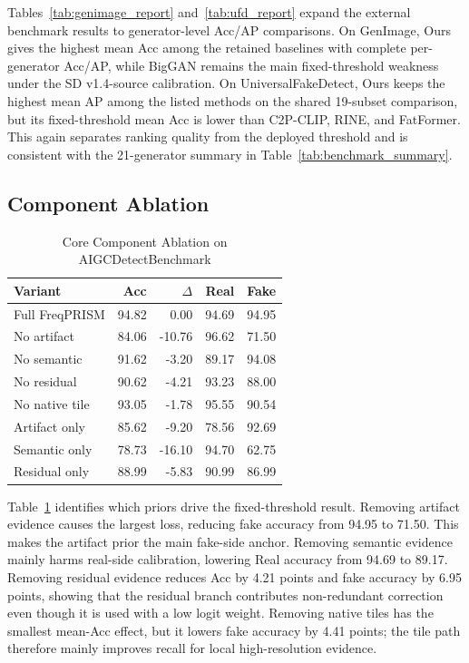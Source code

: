 \documentclass[lettersize,journal]{IEEEtran}
\begin{document}
Tables~\ref{tab:genimage_report} and~\ref{tab:ufd_report} expand the external benchmark results to generator-level Acc/AP comparisons. On GenImage, Ours gives the highest mean Acc among the retained baselines with complete per-generator Acc/AP, while BigGAN remains the main fixed-threshold weakness under the SD v1.4-source calibration. On UniversalFakeDetect, Ours keeps the highest mean AP among the listed methods on the shared 19-subset comparison, but its fixed-threshold mean Acc is lower than C2P-CLIP, RINE, and FatFormer. This again separates ranking quality from the deployed threshold and is consistent with the 21-generator summary in Table~\ref{tab:benchmark_summary}.

\clearpage

\subsection{Component Ablation}
\label{sec:ablation_study}

\begin{table}[t]
\caption{Core Component Ablation on AIGCDetectBenchmark}
\label{tab:prior_ablation}
\centering
\scriptsize
\renewcommand{\arraystretch}{1.08}
\setlength{\tabcolsep}{4pt}
\begin{tabular}{lrrrr}
\toprule
Variant & Acc & $\Delta$ & Real & Fake \\
\midrule
Full FreqPRISM & 94.82 & 0.00 & 94.69 & 94.95 \\
No artifact & 84.06 & -10.76 & 96.62 & 71.50 \\
No semantic & 91.62 & -3.20 & 89.17 & 94.08 \\
No residual & 90.62 & -4.21 & 93.23 & 88.00 \\
No native tile & 93.05 & -1.78 & 95.55 & 90.54 \\
\midrule
Artifact only & 85.62 & -9.20 & 78.56 & 92.69 \\
Semantic only & 78.73 & -16.10 & 94.70 & 62.75 \\
Residual only & 88.99 & -5.83 & 90.99 & 86.99 \\
\bottomrule
\end{tabular}
\end{table}

Table~\ref{tab:prior_ablation} identifies which priors drive the fixed-threshold result. Removing artifact evidence causes the largest loss, reducing fake accuracy from 94.95 to 71.50. This makes the artifact prior the main fake-side anchor. Removing semantic evidence mainly harms real-side calibration, lowering Real accuracy from 94.69 to 89.17. Removing residual evidence reduces Acc by 4.21 points and fake accuracy by 6.95 points, showing that the residual branch contributes non-redundant correction even though it is used with a low logit weight. Removing native tiles has the smallest mean-Acc effect, but it lowers fake accuracy by 4.41 points; the tile path therefore mainly improves recall for local high-resolution evidence.
\end{document}
